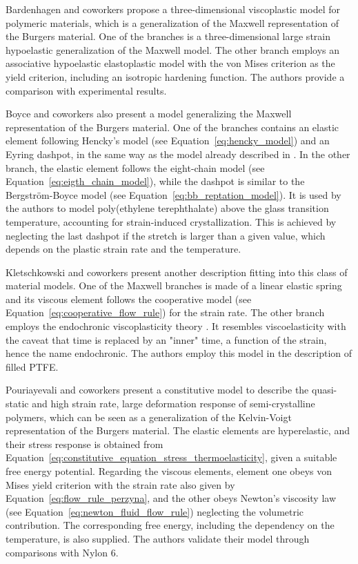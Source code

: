 Bardenhagen and coworkers \citep{bardenhagenThreedimensionalFiniteDeformation1997} propose a three-dimensional viscoplastic model for polymeric materials, which is a generalization of the Maxwell representation of the Burgers material.
One of the branches is a three-dimensional large strain hypoelastic generalization of the Maxwell model.
The other branch employs an associative hypoelastic elastoplastic model with the von Mises criterion as the yield criterion, including an isotropic hardening function.
The authors provide a comparison with experimental results.

Boyce and coworkers \citep{boyceConstitutiveModelFinite2000} also present a model generalizing the Maxwell representation of the Burgers material.
One of the branches contains an elastic element following Hencky's model (see Equation~\eqref{eq:hencky_model}) and an Eyring dashpot, in the same way as the model already described in \cite{boyceLargeInelasticDeformation1988}.
In the other branch, the elastic element follows the eight-chain model (see Equation~\eqref{eq:eigth_chain_model}), while the dashpot is similar to the Bergström-Boyce model (see Equation~\eqref{eq:bb_reptation_model}).
It is used by the authors to model poly(ethylene terephthalate) above the glass transition temperature, accounting for strain-induced crystallization.
This is achieved by neglecting the last dashpot if the stretch is larger than a given value, which depends on the plastic strain rate and the temperature.

Kletschkowski and coworkers \citep{kletschkowskiEndochronicViscoplasticMaterial2002} present another description fitting into this class of material models.
One of the Maxwell branches is made of a linear elastic spring and its viscous element follows the cooperative model (see Equation~\eqref{eq:cooperative_flow_rule}) for the strain rate.
The other branch employs the endochronic viscoplasticity theory \citep{valanisTheoryViscoplasticityYield1970}.
It resembles viscoelasticity with the caveat that time is replaced by an "inner" time, a function of the strain, hence the name endochronic.
The authors employ this model in the description of filled PTFE.

Pouriayevali and coworkers \citep{pouriayevaliConstitutiveDescriptionRatesensitive2013} present a constitutive model to describe the quasi-static and high strain rate, large deformation response of semi-crystalline polymers, which can be seen as a generalization of the Kelvin-Voigt representation of the Burgers material.
The elastic elements are hyperelastic, and their stress response is obtained from Equation~\eqref{eq:constitutive_equation_stress_thermoelasticity}, given a suitable free energy potential.
Regarding the viscous elements, element one obeys von Mises yield criterion with the strain rate also given by Equation~\eqref{eq:flow_rule_perzyna}, and the other obeys Newton's viscosity law (see Equation~\eqref{eq:newton_fluid_flow_rule}) neglecting the volumetric contribution.
The corresponding free energy, including the dependency on the temperature, is also supplied.
The authors validate their model through comparisons with Nylon 6.

